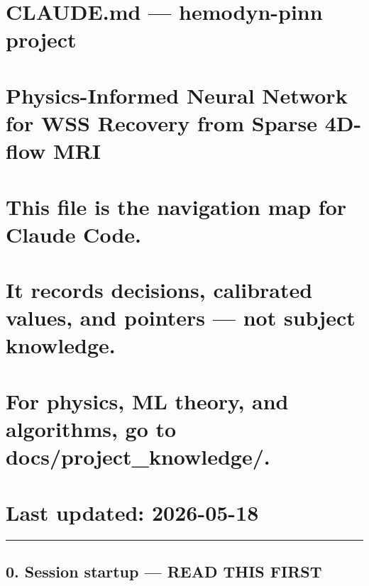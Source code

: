 \documentclass[
]{article}
\author{}
\date{\vspace{-2.5em}}
\begin{document}
\section{CLAUDE.md --- hemodyn-pinn
project}\label{claude.md-hemodyn-pinn-project}

\section{Physics-Informed Neural Network for WSS Recovery from Sparse
4D-flow
MRI}\label{physics-informed-neural-network-for-wss-recovery-from-sparse-4d-flow-mri}

\section{}\label{section}

\section{This file is the navigation map for Claude
Code.}\label{this-file-is-the-navigation-map-for-claude-code.}

\section{It records decisions, calibrated values, and pointers --- not
subject
knowledge.}\label{it-records-decisions-calibrated-values-and-pointers-not-subject-knowledge.}

\section{For physics, ML theory, and algorithms, go to
docs/project\_knowledge/.}\label{for-physics-ml-theory-and-algorithms-go-to-docsproject_knowledge.}

\section{}\label{section-1}

\section{Last updated: 2026-05-18}\label{last-updated-2026-05-18}

\begin{center}\rule{0.5\linewidth}{0.5pt}\end{center}

\subsection{0. Session startup --- READ THIS
FIRST}\label{session-startup-read-this-first}
\end{document}
